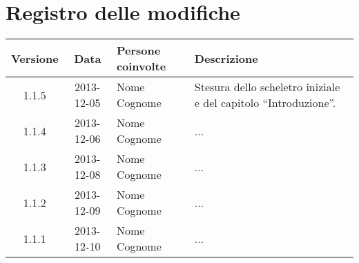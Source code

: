\section*{Registro delle modifiche}

\small{
\begin{tabularx}{\textwidth}{|c|c|l|X|}
 \hline \textbf{Versione} & \textbf{Data} & \textbf{Persone coinvolte} & \textbf{Descrizione} \\

 
 \hline 1.1.5 & 2013-12-05 & Nome Cognome &
 Stesura dello scheletro iniziale e del capitolo ``Introduzione''.\\

 \hline 1.1.4 & 2013-12-06 & Nome Cognome &
 ...\\

 \hline 1.1.3 & 2013-12-08 & Nome Cognome &
 ...\\

 \hline 1.1.2 & 2013-12-09 & Nome Cognome &
 ...\\

 \hline 1.1.1 & 2013-12-10 & Nome Cognome &
 ...\\

 \hline
\end{tabularx}
}
